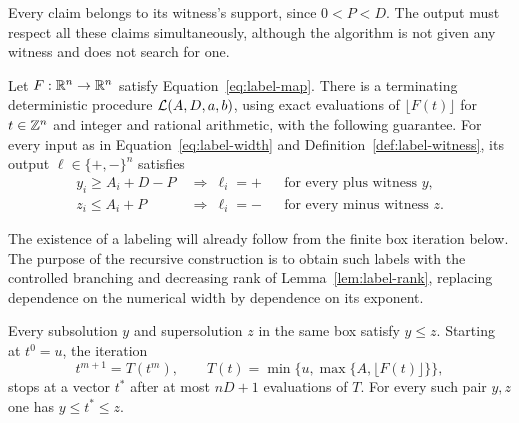 Every claim belongs to its witness's support, since $0<P<D$.
The output must respect all these claims simultaneously, although
the algorithm is not given any witness and does not search for one.

\begin{theorem}
\label{thm:labeling}
Let $F:\mathbb R^n\to\mathbb R^n$ satisfy Equation~\eqref{eq:label-map}.
There is a terminating deterministic procedure $\mathcal L(A,D,a,b)$,
using exact evaluations of $\lfloor F(t)\rfloor$ for $t\in\mathbb Z^n$
and integer and rational arithmetic, with the following guarantee.
For every input as in Equation~\eqref{eq:label-width} and
Definition~\ref{def:label-witness}, its output
$\ell\in\{+,-\}^n$ satisfies
\[
 \begin{aligned}
 y_i\ge A_i+D-P&\ \Longrightarrow\ \ell_i=+
       &&\text{for every plus witness }y,\\
 z_i\le A_i+P&\ \Longrightarrow\ \ell_i=-
       &&\text{for every minus witness }z.
 \end{aligned}
\]
\end{theorem}

The existence of a labeling will already follow from the finite box
iteration below.  The purpose of the recursive construction is to
obtain such labels with the controlled branching and decreasing rank
of Lemma~\ref{lem:label-rank}, replacing dependence on the numerical
width by dependence on its exponent.

\begin{lemma}
\label{lem:label-comparison}
Every subsolution $y$ and supersolution $z$ in the same box satisfy
$y\le z$.  Starting at $t^0=u$, the iteration
\begin{equation}
 t^{m+1}=T(t^m),\qquad
 T(t)=\min\{u,\max\{A,\lfloor F(t)\rfloor\}\},
 \label{eq:label-floor}
\end{equation}
stops at a vector $t^*$ after at most $nD+1$ evaluations of $T$.
For every such pair $y,z$ one has $y\le t^*\le z$.
\end{lemma}

